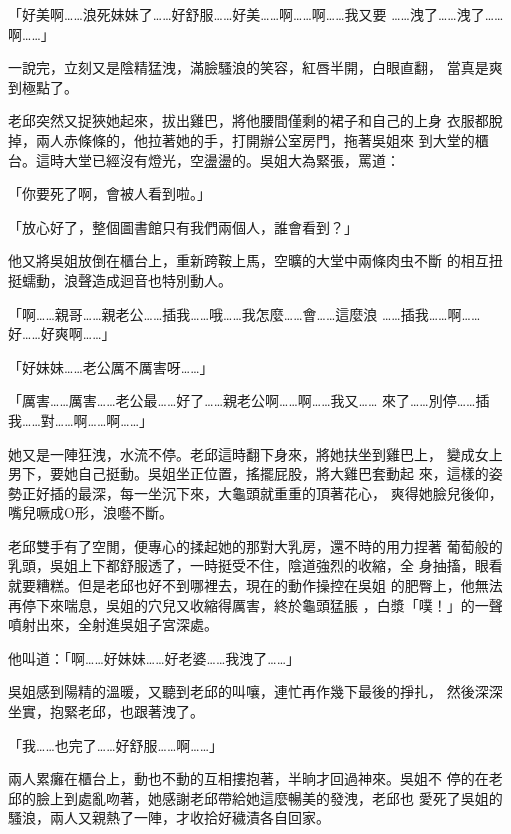 「好美啊……浪死妹妹了……好舒服……好美……啊……啊……我又要
……洩了……洩了……啊……」

一說完，立刻又是陰精猛洩，滿臉騷浪的笑容，紅唇半開，白眼直翻，
當真是爽到極點了。

老邱突然又捉狹她起來，拔出雞巴，將他腰間僅剩的裙子和自己的上身
衣服都脫掉，兩人赤條條的，他拉著她的手，打開辦公室房門，拖著吳姐來
到大堂的櫃台。這時大堂已經沒有燈光，空盪盪的。吳姐大為緊張，罵道：

「你要死了啊，會被人看到啦。」

「放心好了，整個圖書館只有我們兩個人，誰會看到？」

他又將吳姐放倒在櫃台上，重新跨鞍上馬，空曠的大堂中兩條肉虫不斷
的相互扭挺蠕動，浪聲造成迴音也特別動人。

「啊……親哥……親老公……插我……哦……我怎麼……會……這麼浪
……插我……啊……好……好爽啊……」

「好妹妹……老公厲不厲害呀……」

「厲害……厲害……老公最……好了……親老公啊……啊……我又……
來了……別停……插我……對……啊……啊……」

她又是一陣狂洩，水流不停。老邱這時翻下身來，將她扶坐到雞巴上，
變成女上男下，要她自己挺動。吳姐坐正位置，搖擺屁股，將大雞巴套動起
來，這樣的姿勢正好插的最深，每一坐沉下來，大龜頭就重重的頂著花心，
爽得她臉兒後仰，嘴兒噘成O形，浪囈不斷。

老邱雙手有了空閒，便專心的揉起她的那對大乳房，還不時的用力捏著
葡萄般的乳頭，吳姐上下都舒服透了，一時挺受不住，陰道強烈的收縮，全
身抽搐，眼看就要糟糕。但是老邱也好不到哪裡去，現在的動作操控在吳姐
的肥臀上，他無法再停下來喘息，吳姐的穴兒又收縮得厲害，終於龜頭猛脹
，白漿「噗！」的一聲噴射出來，全射進吳姐子宮深處。

他叫道：「啊……好妹妹……好老婆……我洩了……」

吳姐感到陽精的溫暖，又聽到老邱的叫嚷，連忙再作幾下最後的掙扎，
然後深深坐實，抱緊老邱，也跟著洩了。

「我……也完了……好舒服……啊……」

兩人累癱在櫃台上，動也不動的互相摟抱著，半晌才回過神來。吳姐不
停的在老邱的臉上到處亂吻著，她感謝老邱帶給她這麼暢美的發洩，老邱也
愛死了吳姐的騷浪，兩人又親熱了一陣，才收拾好穢漬各自回家。










